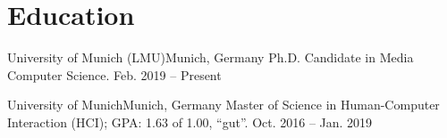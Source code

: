 \section{\textbf{Education}}
  \resumeSubHeadingListStartNoLabel

  \resumeSubheading
    {University of Munich (LMU)}{Munich, Germany}
    {Ph.D. Candidate in Media Computer Science.
    }{Feb. 2019 -- Present}
    \resumeItemListStart
    \resumeItemListEnd


  \resumeSubheading
    {University of Munich}{Munich, Germany}
    {Master of Science in Human-Computer Interaction (HCI); GPA: 1.63 of 1.00, ``gut''.
  }{Oct. 2016 -- Jan. 2019}
  \resumeItemListStart
  \resumeItemListEnd

